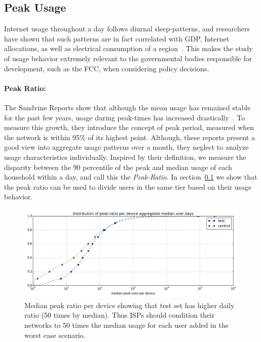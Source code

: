 \subsection{Peak Usage}\label{subsec:peakratio}


Internet usage throughout a day follows diurnal sleep-patterns, and researchers
have shown that such patterns are in fact correlated with GDP, Internet allocations,
as well as electrical consumption of a region~\cite{ant-diurnal-web}. This makes
the study of usage behavior extremely relevant to the governmental bodies responsible
for development, such as the FCC, when considering policy decisions. 


\paragraph{Peak Ratio: }The Sandvine Reports show that although the mean usage has remained
stable for the past few years, usage during peak-times has increased
drastically~\cite{sandvine20141h}. To measure this growth, they introduce the
concept of peak period, measured when the network is within 95\% of its highest point.
Although, these reports present a good view into aggregate usage patterns over a month,
they neglect to analyze usage characteristics individually. Inspired by their
definition, we measure the disparity between the 90 percentile of the peak and median
usage of each household within a day, and call this the \emph{Peak-Ratio}. In
section~\ref{subsec:peakratio} we show that the peak ratio can be used
to divide users in the same tier based on their usage behavior.


\begin{figure}[ht]
\begin{minipage}{0.90\linewidth}
\centering
\includegraphics[width=1\linewidth]{figures/peakratio-CDF-devices-MEDIAN.png}
\caption{Median peak ratio per device showing that test set has higher daily ratio (50 times by median). Thus ISPs should condition their networks to 50 times the median usage for each user added in the worst case scenario.}
\label{fig:CDF-peak-ratio-median}
\end{minipage}
\end{figure}

